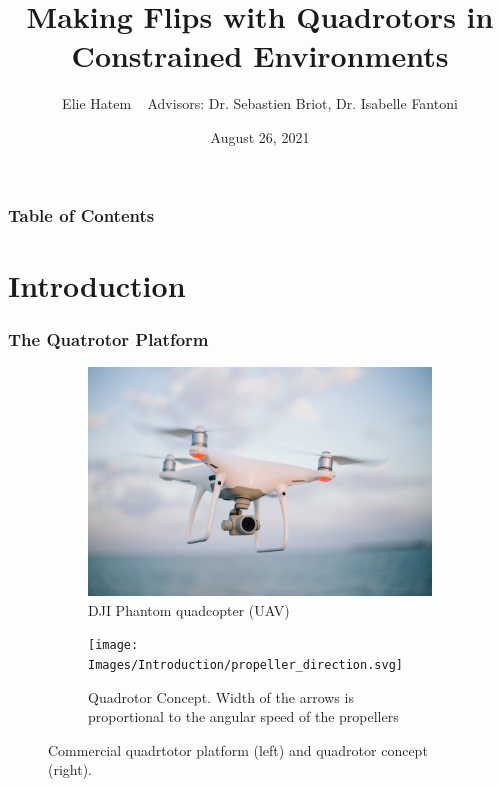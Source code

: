 \documentclass{thesisbeamer}
\title[Making Flips with Quadrotors in Constrained Environments]{Making Flips with Quadrotors in Constrained Environments}
\author[Elie Hatem]{Elie Hatem \newline ~ \newline \normalsize{Advisors: Dr. Sebastien Briot, Dr. Isabelle Fantoni}}
\date{August 26, 2021}
\newcommand\Fontvi{\fontsize{9}{10}\selectfont}
\begin{document}
\MakeTitleNoFoot

\begin{frame}[allowframebreaks]
	\frametitle{Table of Contents}
     \tableofcontents
\end{frame}


\section{Introduction}

\begin{frame}
\frametitle{The Quatrotor Platform}
\Fontvi

\begin{figure}[t]
     \centering
     \begin{subfigure}[b]{0.45\textwidth}
         \centering
         \includegraphics[width=\textwidth]{Images/Introduction/drone}
         \caption[Caption for LOF]{DJI Phantom quadcopter (UAV)\protect\footnotemark}
         \label{fig:drone}
     \end{subfigure}
     \hfill
     \begin{subfigure}[b]{0.45\textwidth}
         \centering
         \texttt{[image: Images/Introduction/propeller\_direction.svg]}
         \caption{Quadrotor Concept. Width of the arrows is proportional to the angular speed of the propellers\protect\footnotemark}
         \label{fig:propeller_directions}
     \end{subfigure}
        \caption{Commercial quadrtotor platform (left) and quadrotor concept (right).}
        \label{fig:three graphs}
\end{figure}


\end{frame}
\end{document}
